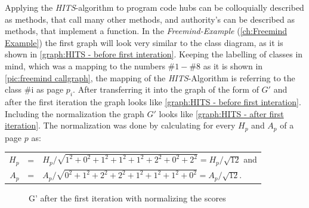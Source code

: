Applying the \emph{HITS}-algorithm to program code hubs can be colloquially described as methods, that call many other methods, and authority's can be described as methods, that implement a function.\newline
In the \textit{Freemind-Example} (\autoref{ch:Freemind Example}) the first graph will look very similar to the class diagram, as it is shown in \autoref{graph:HITS - before first interation}. Keeping the labelling of classes in mind, which was a mapping to the numbers $\#1-\#8$ as it is shown in \autoref{pic:freemind callgraph}, the mapping of the \textit{HITS}-Algorithm is referring to the class \#i as page $p_i$.
After transferring it into the graph of the form of $G'$ and after the first iteration the graph looks like \autoref{graph:HITS - before first interation}. \newline
Including the normalization the graph $G'$ looks like \autoref{graph:HITS - after first iteration}. The normalization was done by calculating for every $H_p$ and $A_p$ of a page $p$ as:\newline
\begin{center}
  \begin{tabular}{ r c l }
    $H_p$ & = &$H_p / \sqrt{1^2+0^2+1^2+1^2+1^2+2^2+0^2+2^2} = H_p/ \sqrt{12}$ and \\
  $A_p$ & = &$ A_p / \sqrt{0^2+1^2+2^2+2^2+1^2+1^2+1^2+0^2} = A_p/ \sqrt{12}$. \\
  \end{tabular}
\end{center}  
  
\begin{figure}
  \centering
  \caption{G' after the first iteration with normalizing the scores}
  \label{graph:HITS - after first iteration}
\end{figure}

